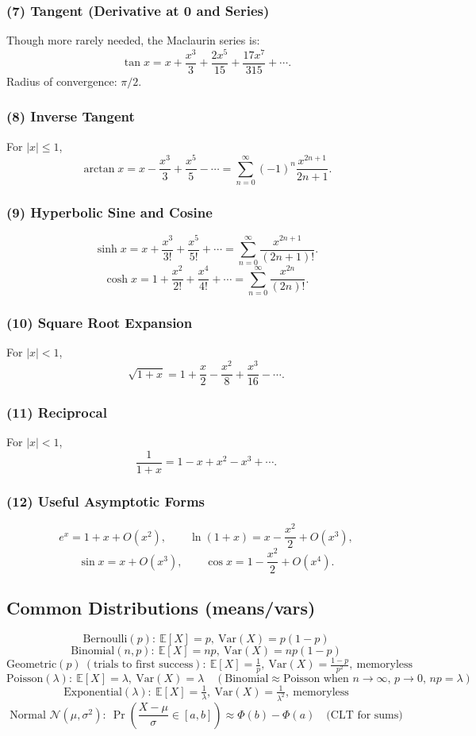 \documentclass[9pt]{extarticle}
\begin{document}
\subsubsection*{(7) Tangent (Derivative at 0 and Series)}
Though more rarely needed, the Maclaurin series is:
\[
\tan x
= x + \frac{x^3}{3} + \frac{2x^5}{15} + \frac{17x^7}{315} + \cdots.
\]
Radius of convergence: \(\pi/2\).

\subsubsection*{(8) Inverse Tangent}
For \(|x|\le 1\),
\[
\arctan x
    = x - \frac{x^3}{3} + \frac{x^5}{5} - \cdots
    = \sum_{n=0}^{\infty} (-1)^n \frac{x^{2n+1}}{2n+1}.
\]

\subsubsection*{(9) Hyperbolic Sine and Cosine}
\[
\sinh x = x + \frac{x^3}{3!} + \frac{x^5}{5!} + \cdots
= \sum_{n=0}^\infty \frac{x^{2n+1}}{(2n+1)!}.
\]
\[
\cosh x = 1 + \frac{x^2}{2!} + \frac{x^4}{4!} + \cdots
= \sum_{n=0}^\infty \frac{x^{2n}}{(2n)!}.
\]

\subsubsection*{(10) Square Root Expansion}
For \(|x|<1\),
\[
\sqrt{1+x}
    = 1 + \frac{x}{2} - \frac{x^2}{8} + \frac{x^3}{16} - \cdots.
\]

\subsubsection*{(11) Reciprocal}
For \(|x|<1\),
\[
\frac{1}{1+x}
    = 1 - x + x^2 - x^3 + \cdots.
\]

\subsubsection*{(12) Useful Asymptotic Forms}
\[
e^x = 1 + x + O(x^2), \qquad
\ln(1+x) = x - \frac{x^2}{2} + O(x^3),
\]
\[
\sin x = x + O(x^3), \qquad
\cos x = 1 - \frac{x^2}{2} + O(x^4).
\]

\subsection{Common Distributions (means/vars)}
\[
\text{Bernoulli}(p):\ \mathbb{E}[X]=p,\ \mathrm{Var}(X)=p(1-p)
\]
\[
\text{Binomial}(n,p):\ \mathbb{E}[X]=np,\ \mathrm{Var}(X)=np(1-p)
\]
\[
\text{Geometric}(p)\ (\text{trials to first success}):\ \mathbb{E}[X]=\tfrac{1}{p},\ \mathrm{Var}(X)=\tfrac{1-p}{p^2},\ \text{memoryless}
\]
\[
\text{Poisson}(\lambda):\ \mathbb{E}[X]=\lambda,\ \mathrm{Var}(X)=\lambda\quad(\text{Binomial}\approx\text{Poisson when }n\to\infty,\,p\to0,\,np=\lambda)
\]
\[
\text{Exponential}(\lambda):\ \mathbb{E}[X]=\tfrac{1}{\lambda},\ \mathrm{Var}(X)=\tfrac{1}{\lambda^2},\ \text{memoryless}
\]
\[
\text{Normal } \mathcal{N}(\mu,\sigma^2):\ \Pr\left(\frac{X-\mu}{\sigma}\in[a,b]\right)\approx \Phi(b)-\Phi(a)\quad\text{(CLT for sums)}
\]
\end{document}
